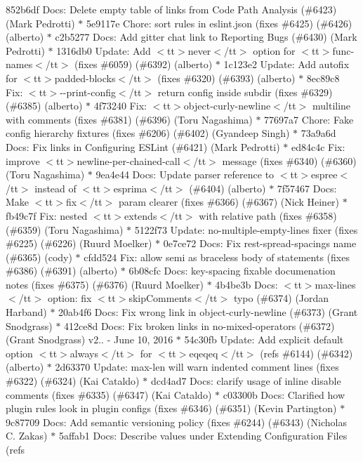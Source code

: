 \begin{DoxyItemize}
852b6df Docs\+: Delete empty table of links from Code Path Analysis (\#6423) (\+Mark Pedrotti) \texorpdfstring{$\ast$}{*} 5e9117e Chore\+: sort rules in eslint.\+json (fixes \#6425) (\#6426) (alberto) \texorpdfstring{$\ast$}{*} c2b5277 Docs\+: Add gitter chat link to Reporting Bugs (\#6430) (\+Mark Pedrotti) \texorpdfstring{$\ast$}{*} 1316db0 Update\+: Add $<$tt$>$never$<$/tt$>$ option for $<$tt$>$func-\/names$<$/tt$>$ (fixes \#6059) (\#6392) (alberto) \texorpdfstring{$\ast$}{*} 1c123e2 Update\+: Add autofix for $<$tt$>$padded-\/blocks$<$/tt$>$ (fixes \#6320) (\#6393) (alberto) \texorpdfstring{$\ast$}{*} 8ec89c8 Fix\+: $<$tt$>$-\/-\/print-\/config$<$/tt$>$ return config inside subdir (fixes \#6329) (\#6385) (alberto) \texorpdfstring{$\ast$}{*} 4f73240 Fix\+: $<$tt$>$object-\/curly-\/newline$<$/tt$>$ multiline with comments (fixes \#6381) (\#6396) (\+Toru Nagashima) \texorpdfstring{$\ast$}{*} 77697a7 Chore\+: Fake config hierarchy fixtures (fixes \#6206) (\#6402) (\+Gyandeep Singh) \texorpdfstring{$\ast$}{*} 73a9a6d Docs\+: Fix links in Configuring ESLint (\#6421) (\+Mark Pedrotti) \texorpdfstring{$\ast$}{*} ed84c4c Fix\+: improve $<$tt$>$newline-\/per-\/chained-\/call$<$/tt$>$ message (fixes \#6340) (\#6360) (\+Toru Nagashima) \texorpdfstring{$\ast$}{*} 9ea4e44 Docs\+: Update parser reference to $<$tt$>$espree$<$/tt$>$ instead of $<$tt$>$esprima$<$/tt$>$ (\#6404) (alberto) \texorpdfstring{$\ast$}{*} 7f57467 Docs\+: Make $<$tt$>$fix$<$/tt$>$ param clearer (fixes \#6366) (\#6367) (\+Nick Heiner) \texorpdfstring{$\ast$}{*} fb49c7f Fix\+: nested $<$tt$>$extends$<$/tt$>$ with relative path (fixes \#6358) (\#6359) (\+Toru Nagashima) \texorpdfstring{$\ast$}{*} 5122f73 Update\+: no-\/multiple-\/empty-\/lines fixer (fixes \#6225) (\#6226) (\+Ruurd Moelker) \texorpdfstring{$\ast$}{*} 0e7ce72 Docs\+: Fix rest-\/spread-\/spacing\textquotesingle{}s name (\#6365) (cody) \texorpdfstring{$\ast$}{*} cfdd524 Fix\+: allow semi as braceless body of statements (fixes \#6386) (\#6391) (alberto) \texorpdfstring{$\ast$}{*} 6b08cfc Docs\+: key-\/spacing fixable documenation notes (fixes \#6375) (\#6376) (\+Ruurd Moelker) \texorpdfstring{$\ast$}{*} 4b4be3b Docs\+: $<$tt$>$max-\/lines$<$/tt$>$ option\+: fix $<$tt$>$skip\+Comments$<$/tt$>$ typo (\#6374) (\+Jordan Harband) \texorpdfstring{$\ast$}{*} 20ab4f6 Docs\+: Fix wrong link in object-\/curly-\/newline (\#6373) (\+Grant Snodgrass) \texorpdfstring{$\ast$}{*} 412ce8d Docs\+: Fix broken links in no-\/mixed-\/operators (\#6372) (\+Grant Snodgrass)  v2.. -\/ June 10, 2016  \texorpdfstring{$\ast$}{*} 54c30fb Update\+: Add explicit default option $<$tt$>$always$<$/tt$>$ for $<$tt$>$eqeqeq$<$/tt$>$ (refs \#6144) (\#6342) (alberto) \texorpdfstring{$\ast$}{*} 2d63370 Update\+: max-\/len will warn indented comment lines (fixes \#6322) (\#6324) (\+Kai Cataldo) \texorpdfstring{$\ast$}{*} dcd4ad7 Docs\+: clarify usage of inline disable comments (fixes \#6335) (\#6347) (\+Kai Cataldo) \texorpdfstring{$\ast$}{*} c03300b Docs\+: Clarified how plugin rules look in plugin configs (fixes \#6346) (\#6351) (\+Kevin Partington) \texorpdfstring{$\ast$}{*} 9c87709 Docs\+: Add semantic versioning policy (fixes \#6244) (\#6343) (\+Nicholas C. Zakas) \texorpdfstring{$\ast$}{*} 5affab1 Docs\+: Describe values under Extending Configuration Files (refs 
\end{DoxyItemize}
